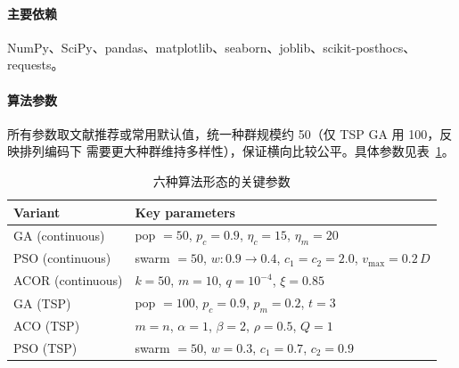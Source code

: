 \documentclass[12pt,a4paper,fontset=windows]{ctexart}
\begin{document}
\paragraph{主要依赖}
NumPy、SciPy、pandas、matplotlib、seaborn、joblib、scikit-posthocs、requests。

\paragraph{算法参数}
所有参数取文献推荐或常用默认值，统一种群规模约 50（仅 TSP GA 用 100，反映排列编码下
需要更大种群维持多样性），保证横向比较公平。具体参数见表~\ref{tab:params}。

\begin{table}[H]
  \centering
  \caption{六种算法形态的关键参数}
  \label{tab:params}
  \small
  \begin{tabularx}{\linewidth}{lX}
    \toprule
    Variant & Key parameters \\
    \midrule
    GA (continuous)   & pop $=50$, $p_c=0.9$, $\eta_c=15$, $\eta_m=20$ \\
    PSO (continuous)  & swarm $=50$, $w\!:\!0.9\!\to\!0.4$, $c_1=c_2=2.0$, $v_{\max}=0.2\,D$ \\
    ACOR (continuous) & $k=50$, $m=10$, $q=10^{-4}$, $\xi=0.85$ \\
    GA (TSP)          & pop $=100$, $p_c=0.9$, $p_m=0.2$, $t=3$ \\
    ACO (TSP)         & $m=n$, $\alpha=1$, $\beta=2$, $\rho=0.5$, $Q=1$ \\
    PSO (TSP)         & swarm $=50$, $w=0.3$, $c_1=0.7$, $c_2=0.9$ \\
    \bottomrule
  \end{tabularx}
\end{table}
\end{document}
